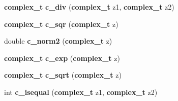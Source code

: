 \begin{CompactItemize}
\item 
{\bf complex\_\-t} \textbf{c\_\-div} ({\bf complex\_\-t} z1, {\bf complex\_\-t} z2)\label{group__nr_g3cb3d7ddec167a30a5f7a159dea26c0f}

\item 
{\bf complex\_\-t} \textbf{c\_\-sqr} ({\bf complex\_\-t} z)\label{group__nr_g72516630e1d745f5d1630b4c525cb5f8}

\item 
double \textbf{c\_\-norm2} ({\bf complex\_\-t} z)\label{group__nr_g98f394b1ddccfeb4d9b5edb6c1f8c652}

\item 
{\bf complex\_\-t} \textbf{c\_\-exp} ({\bf complex\_\-t} z)\label{group__nr_g41a40da9e1d42de8e76d999abd476f8a}

\item 
{\bf complex\_\-t} \textbf{c\_\-sqrt} ({\bf complex\_\-t} z)\label{group__nr_g22d2bd8775120d34e3b700682e67d955}

\item 
int \textbf{c\_\-isequal} ({\bf complex\_\-t} z1, {\bf complex\_\-t} z2)\label{group__nr_gd3e4d63450915ff27b8e506acb21bb2e}

\end{CompactItemize}
